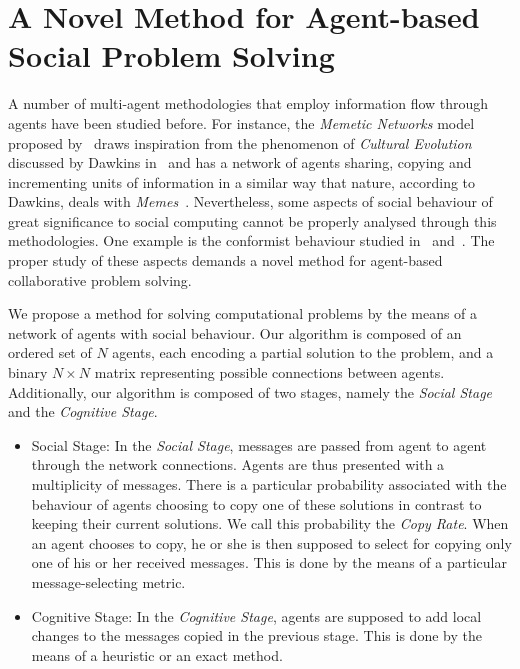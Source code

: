 \documentclass[letterpaper]{article}
\begin{document}
\section{A Novel Method for Agent-based Social Problem Solving}

A number of multi-agent methodologies that employ information flow through agents have been studied before. For instance, the {\em Memetic Networks} model proposed by~\cite{araujo:memenet} draws inspiration from the phenomenon of {\em Cultural Evolution} discussed by Dawkins in~\cite{dawkins:selfishgene} and has a network of agents sharing, copying and incrementing units of information in a similar way that nature, according to Dawkins, deals with {\em Memes}~\cite{dawkins:selfishgene}. Nevertheless, some aspects of social behaviour of great significance to social computing cannot be properly analysed through this methodologies. One example is the conformist behaviour studied in~\cite{cefferson:conformists} and~\cite{farenzena:collabem}. The proper study of these aspects demands a novel method for agent-based collaborative problem solving.

We propose a method for solving computational problems by the means of a network of agents with social behaviour. Our algorithm is composed of an ordered set of $N$ agents, each encoding a partial solution to the problem, and a binary $N \times N$ matrix representing possible connections between agents. Additionally, our algorithm is composed of two stages, namely the {\em Social Stage} and the {\em Cognitive Stage}. 

\begin{itemize}
\item
Social Stage: In the {\em Social Stage}, messages are passed from agent to agent through the network connections. Agents are thus presented with a multiplicity of messages. There is a particular probability associated with the behaviour of agents choosing to copy one of these solutions in contrast to keeping their current solutions. We call this probability the {\em Copy Rate}. When an agent chooses to copy, he or she is then supposed to select for copying only one of his or her received messages. This is done by the means of a particular message-selecting metric.

\item
Cognitive Stage: In the {\em Cognitive Stage}, agents are supposed to add local changes to the messages copied in the previous stage. This is done by the means of a heuristic or an exact method.
\end{itemize}
\end{document}
